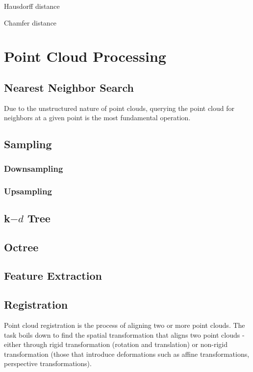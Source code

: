 Hausdorff distance

Chamfer distance

\section{Point Cloud Processing}

\subsection{Nearest Neighbor Search}
Due to the unstructured nature of point clouds, querying the point cloud for neighbors at a given point is the most fundamental operation.

\subsection{Sampling}

\subsubsection{Downsampling}

\subsubsection{Upsampling}

\subsection{k$-d$ Tree}

\subsection{Octree}

\subsection{Feature Extraction}


\subsection{Registration}
Point cloud registration is the process of aligning two or more point clouds. The task boils down to find the spatial transformation that aligns two point clouds - either through rigid transformation (rotation and translation) or non-rigid transformation (those that introduce deformations such as affine transformations, perspective transformations).



\nocite{*}




